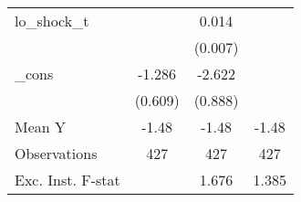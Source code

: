 {\begin{tabular}{l*{3}{c}}
\addlinespace
lo\_shock\_t  &                     &       0.014\sym{*}  &                     \\
            &                     &     (0.007)         &                     \\
\addlinespace
\_cons      &      -1.286\sym{**} &      -2.622\sym{***}&                     \\
            &     (0.609)         &     (0.888)         &                     \\
\midrule
Mean Y      &       -1.48         &       -1.48         &       -1.48         \\
Observations&         427         &         427         &         427         \\
Exc. Inst. F-stat&                     &       1.676         &       1.385         \\
\bottomrule
\end{tabular}
}
